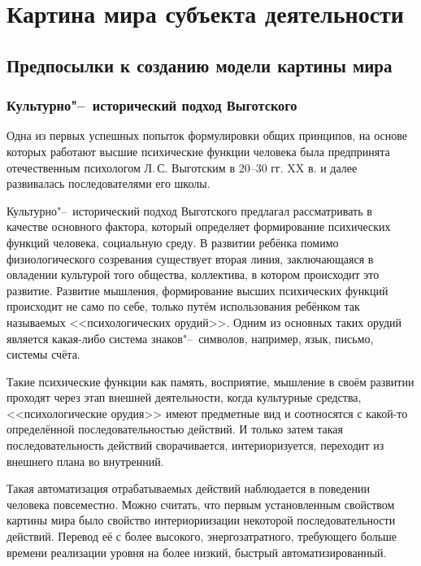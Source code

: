 \chapter{Картина мира субъекта деятельности} \label{chapt1}

\section{Предпосылки к созданию модели картины мира} \label{sect1_1}

\subsection{Культурно"--~исторический подход Выготского}

Одна из первых успешных попыток формулировки общих принципов, на основе которых работают высшие психические функции человека была предпринята отечественным психологом Л.\,С. Выготским в 20--30 гг. XX в. \cite{Vygotsky2005} и далее развивалась последователями его школы. 

Культурно"--~исторический подход Выготского предлагал рассматривать в качестве основного фактора, который определяет формирование психических функций человека, социальную среду. В развитии ребёнка помимо физиологического созревания существует вторая линия, заключающаяся в овладении культурой того общества, коллектива, в котором происходит это развитие. Развитие мышления, формирование высших психических функций происходит не само по себе, только путём использования ребёнком так называемых <<психологических орудий>>. Одним из основных таких орудий является какая-либо система знаков"--~символов, например, язык, письмо, системы счёта.

Такие психические функции как память, восприятие, мышление в своём развитии проходят через этап внешней деятельности, когда культурные средства, <<психологические орудия>> имеют предметные вид и соотносятся с какой-то определённой последовательностью действий. И только затем такая последовательность действий сворачивается, интериоризуется, переходит из внешнего плана во внутренний. 

Такая автоматизация отрабатываемых действий наблюдается в поведении человека повсеместно. Можно считать, что первым установленным свойством картины мира было свойство интериориизации некоторой последовательности действий. Перевод её с более высокого, энергозатратного, требующего больше времени реализации уровня на более низкий, быстрый автоматизированный.

